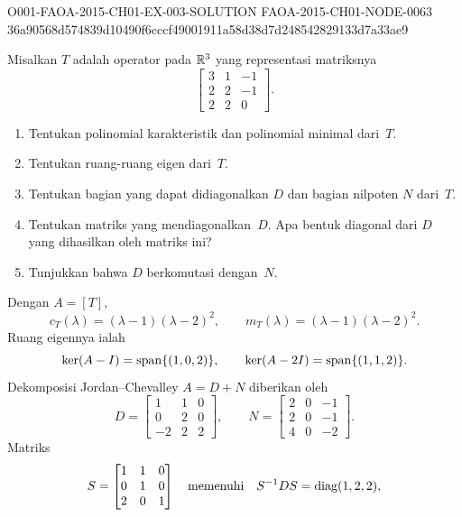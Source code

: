 \begin{o001solution}
  {O001-FAOA-2015-CH01-EX-003-SOLUTION}
  {FAOA-2015-CH01-NODE-0063}
  {36a90568d574839d10490f6cccf49001911a58d38d7d248542829133d7a33ae9}
\begin{o001statement}
Misalkan $T$ adalah operator pada $\mathbb{R}^3$ yang representasi matriksnya
 \[ \begin{bmatrix}
        3  &  1  & -1 \\
        2  &  2  & -1 \\
        2  &  2  &  0
  \end{bmatrix}. \]

 \begin{enumerate}
  \item Tentukan polinomial karakteristik dan polinomial minimal dari~$T$.
  \item Tentukan ruang-ruang eigen dari~$T$.
  \item Tentukan bagian yang dapat didiagonalkan $D$ dan bagian nilpoten $N$ dari~$T$.
  \item Tentukan matriks yang mendiagonalkan~$D$. Apa bentuk diagonal
dari $D$ yang dihasilkan oleh matriks ini?
  \item Tunjukkan bahwa $D$ berkomutasi dengan~$N$.
 \end{enumerate}
\end{o001statement}
\begin{o001answer}
Dengan $A=[T]$,
\[
 c_T(\lambda)=(\lambda-1)(\lambda-2)^2,\qquad
 m_T(\lambda)=(\lambda-1)(\lambda-2)^2.
\]
Ruang eigennya ialah
\[
 \ker(A-I)=\operatorname{span}\{(1,0,2)\},\qquad
 \ker(A-2I)=\operatorname{span}\{(1,1,2)\}.
\]
Dekomposisi Jordan--Chevalley $A=D+N$ diberikan oleh
\[
D=\begin{bmatrix}1&1&0\\0&2&0\\-2&2&2\end{bmatrix},
\qquad
N=\begin{bmatrix}2&0&-1\\2&0&-1\\4&0&-2\end{bmatrix}.
\]
Matriks
\[
S=\begin{bmatrix}1&1&0\\0&1&0\\2&0&1\end{bmatrix}
\quad\text{memenuhi}\quad
S^{-1}DS=\operatorname{diag}(1,2,2),
\]
\end{o001answer}
\end{o001solution}
